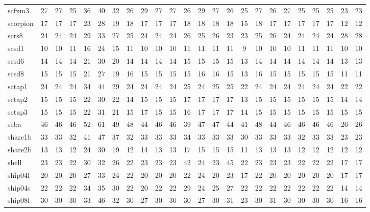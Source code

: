 \begin{longtable}{lccccccccccccccccccccccc}
scfxm3 & 27 & 27 & 25 & 36 & 40 & 32 & 26 & 29 & 27 & 27 & 26 & 29 & 27 & 26 & 25 & 27 & 26 & 27 & 25 & 25 & 25 & 23 & 23 \\
scorpion & 17 & 17 & 17 & 23 & 28 & 19 & 18 & 17 & 17 & 17 & 18 & 18 & 18 & 18 & 15 & 18 & 17 & 17 & 17 & 17 & 17 & 12 & 12 \\
scrs8 & 24 & 24 & 24 & 29 & 33 & 27 & 25 & 24 & 24 & 24 & 26 & 25 & 26 & 23 & 23 & 25 & 26 & 24 & 24 & 24 & 24 & 28 & 28 \\
scsd1 & 10 & 10 & 11 & 16 & 24 & 15 & 11 & 10 & 10 & 10 & 11 & 11 & 11 & 11 & 9 & 10 & 10 & 10 & 11 & 11 & 11 & 10 & 10 \\
scsd6 & 14 & 14 & 14 & 21 & 30 & 20 & 14 & 14 & 14 & 14 & 15 & 15 & 15 & 15 & 13 & 14 & 14 & 14 & 14 & 14 & 14 & 13 & 13 \\
scsd8 & 15 & 15 & 15 & 21 & 27 & 19 & 16 & 15 & 15 & 15 & 15 & 16 & 16 & 15 & 13 & 16 & 15 & 15 & 15 & 15 & 15 & 11 & 11 \\
sctap1 & 24 & 24 & 24 & 34 & 44 & 29 & 24 & 24 & 24 & 24 & 25 & 24 & 25 & 25 & 22 & 24 & 24 & 24 & 24 & 24 & 24 & 22 & 22 \\
sctap2 & 15 & 15 & 15 & 22 & 30 & 22 & 14 & 15 & 15 & 15 & 17 & 17 & 17 & 17 & 13 & 15 & 15 & 15 & 15 & 15 & 15 & 14 & 14 \\
sctap3 & 15 & 15 & 15 & 22 & 31 & 21 & 15 & 17 & 15 & 15 & 16 & 17 & 17 & 17 & 14 & 15 & 15 & 15 & 15 & 15 & 15 & 15 & 15 \\
seba & 46 & 46 & 46 & 52 & 61 & 49 & 48 & 44 & 46 & 46 & 39 & 47 & 47 & 44 & 41 & 48 & 44 & 46 & 46 & 46 & 46 & 26 & 26 \\
share1b & 33 & 33 & 32 & 41 & 47 & 37 & 32 & 33 & 33 & 33 & 34 & 33 & 33 & 33 & 30 & 33 & 33 & 33 & 32 & 33 & 33 & 23 & 23 \\
share2b & 13 & 13 & 12 & 24 & 30 & 19 & 12 & 14 & 13 & 13 & 17 & 15 & 15 & 15 & 11 & 13 & 13 & 13 & 12 & 12 & 12 & 12 & 12 \\
shell & 23 & 23 & 22 & 30 & 32 & 26 & 22 & 23 & 23 & 23 & 42 & 24 & 23 & 45 & 22 & 23 & 23 & 23 & 22 & 22 & 22 & 17 & 17 \\
ship04l & 20 & 20 & 20 & 27 & 33 & 24 & 22 & 20 & 20 & 20 & 22 & 24 & 20 & 23 & 17 & 22 & 20 & 20 & 20 & 20 & 20 & 17 & 17 \\
ship04s & 22 & 22 & 22 & 34 & 35 & 30 & 22 & 20 & 22 & 22 & 29 & 24 & 25 & 27 & 22 & 22 & 22 & 22 & 22 & 22 & 22 & 14 & 14 \\
ship08l & 30 & 30 & 30 & 33 & 46 & 32 & 30 & 27 & 30 & 30 & 30 & 27 & 30 & 31 & 23 & 30 & 31 & 30 & 30 & 30 & 30 & 16 & 16 \\

\end{longtable}
